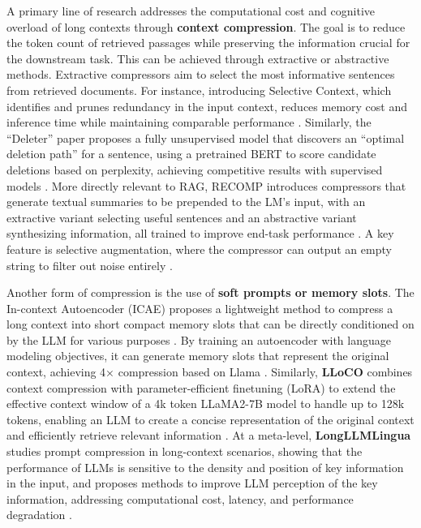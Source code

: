\documentclass[11pt]{article}
\begin{document}
A primary line of research addresses the computational cost and cognitive overload of long contexts through \textbf{context compression}. The goal is to reduce the token count of retrieved passages while preserving the information crucial for the downstream task. This can be achieved through extractive or abstractive methods. Extractive compressors aim to select the most informative sentences from retrieved documents. For instance, introducing Selective Context, which identifies and prunes redundancy in the input context, reduces memory cost and inference time while maintaining comparable performance \cite{ref162}. Similarly, the ``Deleter'' paper proposes a fully unsupervised model that discovers an ``optimal deletion path'' for a sentence, using a pretrained BERT to score candidate deletions based on perplexity, achieving competitive results with supervised models \cite{ref163}. More directly relevant to RAG, RECOMP introduces compressors that generate textual summaries to be prepended to the LM's input, with an extractive variant selecting useful sentences and an abstractive variant synthesizing information, all trained to improve end-task performance \cite{ref164}. A key feature is selective augmentation, where the compressor can output an empty string to filter out noise entirely \cite{ref164}.

Another form of compression is the use of \textbf{soft prompts or memory slots}. The In-context Autoencoder (ICAE) proposes a lightweight method to compress a long context into short compact memory slots that can be directly conditioned on by the LLM for various purposes \cite{ref165}. By training an autoencoder with language modeling objectives, it can generate memory slots that represent the original context, achieving 4× compression based on Llama \cite{ref165}. Similarly, \textbf{LLoCO} combines context compression with parameter-efficient finetuning (LoRA) to extend the effective context window of a 4k token LLaMA2-7B model to handle up to 128k tokens, enabling an LLM to create a concise representation of the original context and efficiently retrieve relevant information \cite{ref166}. At a meta-level, \textbf{LongLLMLingua} studies prompt compression in long-context scenarios, showing that the performance of LLMs is sensitive to the density and position of key information in the input, and proposes methods to improve LLM perception of the key information, addressing computational cost, latency, and performance degradation \cite{ref167}.
\end{document}
